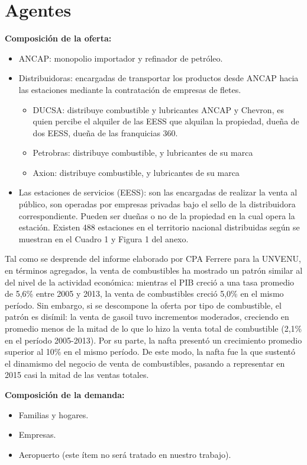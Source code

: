 \documentclass[spanish,A4,11pt]{article}
\begin{document}
\section{Agentes}
\noindent \textbf{Composición de la oferta:}  
\begin{itemize}[noitemsep]
\item ANCAP: monopolio importador y refinador de petróleo.
\item Distribuidoras: encargadas de transportar los productos desde ANCAP hacia las estaciones mediante la contratación de empresas de fletes.
\begin{itemize}[noitemsep]
\item DUCSA: distribuye combustible y lubricantes ANCAP y Chevron, es quien percibe el alquiler de las EESS que alquilan la propiedad, dueña de dos EESS, dueña de las franquicias 360. 
\item Petrobras: distribuye combustible, y lubricantes de su marca
\item Axion: distribuye combustible, y lubricantes de su marca
\end{itemize}
\item Las estaciones de servicios (EESS): son las encargadas de realizar la venta al público, son operadas por empresas privadas bajo el sello de la distribuidora correspondiente. Pueden ser dueñas o no de la propiedad en la cual opera la estación. Existen 488 estaciones en el territorio nacional distribuidas según se muestran en el Cuadro 1 y Figura 1 del anexo.
\end{itemize}

Tal como se desprende del informe elaborado por CPA Ferrere para la UNVENU, en términos agregados, la venta de combustibles ha mostrado un patrón similar al del nivel de la actividad económica: mientras el PIB creció a una tasa promedio de 5,6\% entre 2005 y 2013, la venta de combustibles creció 5,0\% en el mismo período. Sin embargo, si se descompone la oferta por tipo de combustible, el patrón es disímil: la venta de gasoil tuvo incrementos moderados, creciendo en promedio menos de la mitad de lo que lo hizo la venta total de combustible (2,1\% en el período 2005-2013). Por su parte, la nafta presentó un crecimiento promedio superior al 10\% en el mismo período. De este modo, la nafta fue la que sustentó el dinamismo del negocio de venta de combustibles, pasando a representar en 2015 casi la mitad de las ventas totales.\newline

\noindent \textbf{Composición de la demanda:}
\begin{itemize}[noitemsep]
\item Familias y hogares.
\item Empresas.
\item Aeropuerto (este ítem no será tratado en nuestro trabajo).
\end{itemize}
\end{document}
